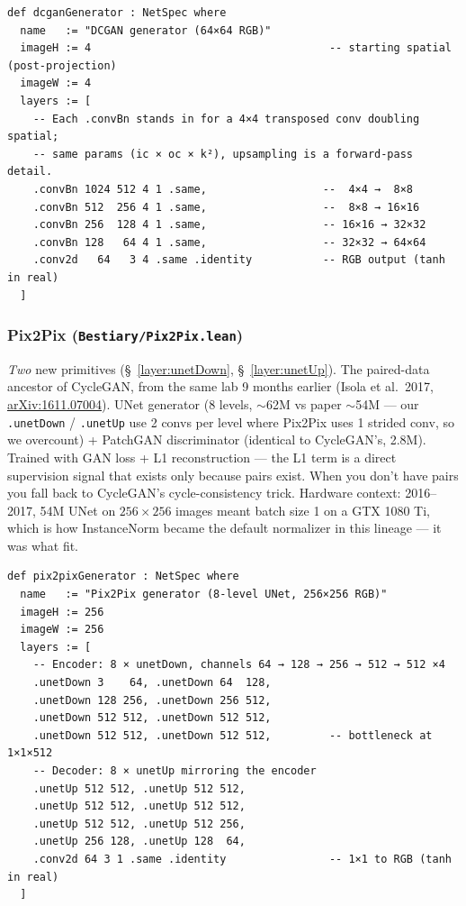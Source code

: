 \begin{verbatim}
def dcganGenerator : NetSpec where
  name   := "DCGAN generator (64×64 RGB)"
  imageH := 4                                     -- starting spatial (post-projection)
  imageW := 4
  layers := [
    -- Each .convBn stands in for a 4×4 transposed conv doubling spatial;
    -- same params (ic × oc × k²), upsampling is a forward-pass detail.
    .convBn 1024 512 4 1 .same,                  --  4×4 →  8×8
    .convBn 512  256 4 1 .same,                  --  8×8 → 16×16
    .convBn 256  128 4 1 .same,                  -- 16×16 → 32×32
    .convBn 128   64 4 1 .same,                  -- 32×32 → 64×64
    .conv2d   64   3 4 .same .identity           -- RGB output (tanh in real)
  ]
\end{verbatim}

\subsubsection*{Pix2Pix (\texttt{Bestiary/Pix2Pix.lean})}
\emph{Two} new primitives (\S~\ref{layer:unetDown}, \S~\ref{layer:unetUp}). The paired-data ancestor of CycleGAN,
from the same lab 9 months earlier (Isola et al.\ 2017,
\href{https://arxiv.org/abs/1611.07004}{arXiv:1611.07004}). UNet
generator (8 levels, $\sim$62M vs paper $\sim$54M --- our
\texttt{.unetDown} / \texttt{.unetUp} use 2 convs per level where
Pix2Pix uses 1 strided conv, so we overcount) + PatchGAN
discriminator (identical to CycleGAN's, 2.8M). Trained with GAN
loss + L1 reconstruction --- the L1 term is a direct supervision
signal that exists only because pairs exist. When you don't have
pairs you fall back to CycleGAN's cycle-consistency trick. Hardware
context: 2016--2017, 54M UNet on $256 \times 256$ images meant
batch size 1 on a GTX 1080 Ti, which is how InstanceNorm became the
default normalizer in this lineage --- it was what fit.

\begin{verbatim}
def pix2pixGenerator : NetSpec where
  name   := "Pix2Pix generator (8-level UNet, 256×256 RGB)"
  imageH := 256
  imageW := 256
  layers := [
    -- Encoder: 8 × unetDown, channels 64 → 128 → 256 → 512 → 512 ×4
    .unetDown 3    64, .unetDown 64  128,
    .unetDown 128 256, .unetDown 256 512,
    .unetDown 512 512, .unetDown 512 512,
    .unetDown 512 512, .unetDown 512 512,         -- bottleneck at 1×1×512
    -- Decoder: 8 × unetUp mirroring the encoder
    .unetUp 512 512, .unetUp 512 512,
    .unetUp 512 512, .unetUp 512 512,
    .unetUp 512 512, .unetUp 512 256,
    .unetUp 256 128, .unetUp 128  64,
    .conv2d 64 3 1 .same .identity                -- 1×1 to RGB (tanh in real)
  ]
\end{verbatim}

